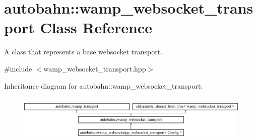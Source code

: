 \hypertarget{classautobahn_1_1wamp__websocket__transport}{}\section{autobahn\+:\+:wamp\+\_\+websocket\+\_\+transport Class Reference}
\label{classautobahn_1_1wamp__websocket__transport}


A class that represents a base websocket transport.  




{\ttfamily \#include $<$wamp\+\_\+websocket\+\_\+transport.\+hpp$>$}

Inheritance diagram for autobahn\+:\+:wamp\+\_\+websocket\+\_\+transport\+:\begin{figure}[H]
\begin{center}
\leavevmode
\includegraphics[height=2.245989cm]{classautobahn_1_1wamp__websocket__transport}
\end{center}
\end{figure}
